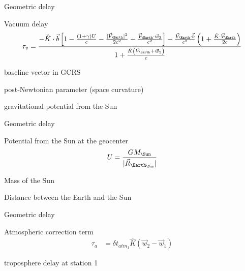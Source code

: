 \documentclass[14pt,table,t, c]{beamer}
\begin{document}
\begin{frame}{Geometric delay}
\begin{block}{Vacuum delay}
\small
\vspace*{-\baselineskip}\setlength\belowdisplayskip{0pt}\setlength\abovedisplayskip{0pt}
\begin{align*}
\tau_{v} &= \frac{-\hat{K}\cdot\vec{b}\left[1 - \frac{(1+\gamma)U}{c} -
\frac{\lvert\vec{V}_{\Earth}\rvert^2}{2c^2} - \frac{\vec{V}_{\Earth}\cdot\vec{w}_2}{c^2}\right] - \frac{\vec{V}_{\Earth}\cdot\vec{b}}{c^2}\left(1 + \frac{\hat{K}\cdot\vec{V}_{\Earth}}{2c}\right)} {1 + \frac{\hat{K}\left(\vec{V}_{\Earth} + \vec{w}_2\right) }{c}} \\ %
\end{align*}
\end{block}
\begin{description}[aa]
\item[$\vec{b}$] baseline vector in GCRS
\item[$\gamma$] post-Newtonian parameter (space curvature)
\item[$U$] gravitational potential from the Sun
\end{description}
\end{frame}

\begin{frame}{Geometric delay}
\begin{block}{Potential from the Sun at the geocenter}
\vspace*{-.5\baselineskip}\setlength\belowdisplayskip{0pt}\setlength\abovedisplayskip{0pt}
\begin{equation*}
U = \frac{GM_{\Sun}}{\lvert\vec{R}_{\Earth_{\Sun}}\rvert}
\end{equation*}
\end{block}
\begin{description}
\item[$M_\Sun$] Mass of the Sun
\item[$\lvert\vec{R}_{\Earth_{\Sun}}\rvert$] Distance between the Earth and the Sun
\end{description}
\end{frame}

\begin{frame}{Geometric delay}
\begin{block}{Atmospheric correction term}
\small
\vspace*{-\baselineskip}\setlength\belowdisplayskip{0pt}\setlength\abovedisplayskip{0pt}
\begin{align*}
\tau_{a} &= \delta t_{{atm}_1}\hat{K}\left(\vec{w}_2 -\vec{w}_1\right)
\end{align*}
\end{block}
\begin{description}
\item[$\delta t_{{atm}_1}$] troposphere delay at station 1
\end{description}
\end{frame}
\end{document}
